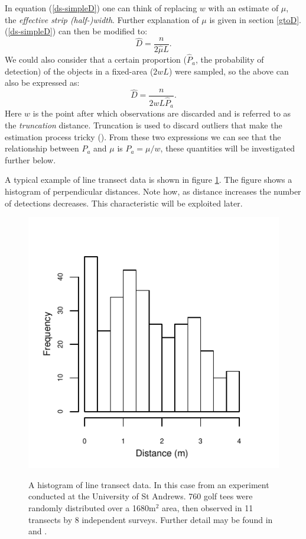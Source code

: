In equation (\ref{ds-simpleD}) one can think of replacing $w$ with an estimate of $\mu$, the \textit{effective strip (half-)width}. Further explanation of $\mu$ is given in section \ref{gtoD}. (\ref{ds-simpleD}) can then be modified to:
\begin{equation}
\hat{D}=\frac{n}{2\hat{\mu}L}.
\label{ds-D}
\end{equation}
We could also consider that a certain proportion ($\hat{P}_a$, the probability of detection) of the objects in a fixed-area ($2wL$) were sampled, so the above can also be expressed as:
\begin{equation*}
\hat{D}=\frac{n}{2wL\hat{P}_a}.
\end{equation*}
Here $w$ is the point after which observations are discarded and is referred to as the \textit{truncation} distance. Truncation is used to discard outliers that make the estimation process tricky (\cite[pp. 15-16]{IDS}). From these two expressions we can see that the relationship between $P_a$ and $\mu$ is $P_a=\mu/w$, these quantities will be investigated further below.

A typical example of line transect data is shown in figure \ref{ds-lt-example}. The figure shows a histogram of perpendicular distances. Note how, as distance increases the number of detections decreases. This characteristic will be exploited later.

\begin{figure}
\centering
\includegraphics{intro/figs/ds-golftee.pdf}\\
\caption{A histogram of line transect data. In this case from an experiment conducted at the University of St Andrews. 760 golf tees were randomly distributed over a 1680m$^2$ area, then observed in 11 transects by 8 independent surveys. Further detail may be found in  and .}
\label{ds-lt-example}
\end{figure}

